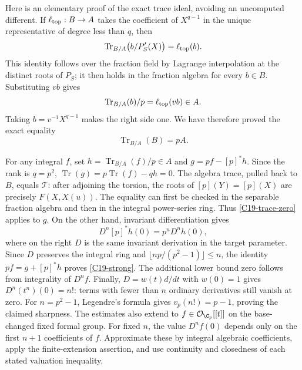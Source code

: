 Here is an elementary proof of the exact trace ideal, avoiding
an uncomputed different.  If $\ell_{
\rm top}:B\to A$ takes the coefficient of $X^{q-1}$ in the
unique representative of degree less than $q$, then
\[
 \operatorname{Tr}_{B/A}\bigl(b/P_S'(X)\bigr)
      =\ell_{\rm top}(b).
\]
This identity follows over the fraction field by Lagrange
interpolation at the distinct roots of $P_S$; it then holds
in the fraction algebra for every $b\in B$.
Substituting $vb$ gives
\[
 \operatorname{Tr}_{B/A}(b)/p=\ell_{\rm top}(vb)\in A.
\]
Taking $b=v^{-1}X^{q-1}$ makes the right side one.
We have therefore proved the exact equality
\begin{equation}\label{C19-trace-ideal}
 \operatorname{Tr}_{B/A}(B)=pA.
\end{equation}

For any integral $f$, set
$h=\operatorname{Tr}_{B/A}(f)/p\in A$ and
$g=pf-[p]^*h$.  Since the rank is $q=p^2$,
$\operatorname{Tr}(g)=p\operatorname{Tr}(f)-qh=0$.
The algebra trace, pulled back to $B$, equals $\mathcal T$:
after adjoining the torsion, the roots of
$[p](Y)=[p](X)$ are precisely $F(X,X(u))$.
The equality can first be checked in the separable fraction
algebra and then in the integral power-series ring.
Thus \eqref{C19-trace-zero} applies to $g$.
On the other hand, invariant differentiation gives
\[
 D^n[p]^*h(0)=p^nD^nh(0),
\]
where on the right $D$ is the same invariant derivation in the
target parameter.  Since $D$ preserves the integral ring and
$\lfloor np/(p^2-1)\rfloor\leq n$, the identity
$pf=g+[p]^*h$ proves \eqref{C19-strong}.
The additional lower bound zero follows from integrality of
$D^nf$.  Finally, $D=w(t)d/dt$ with $w(0)=1$ gives
$D^n(t^n)(0)=n!$: terms with fewer than $n$ ordinary derivatives
still vanish at zero.  For $n=p^2-1$, Legendre's formula gives
$v_p(n!)=p-1$, proving the claimed sharpness.
The estimates also extend to $f\in\mathcal O_{\C_p}[[t]]$
on the base-changed fixed formal group.  For fixed $n$, the
value $D^nf(0)$ depends only on the first $n+1$ coefficients
of $f$.  Approximate these by integral algebraic coefficients,
apply the finite-extension assertion, and use continuity and
closedness of each stated valuation inequality.

